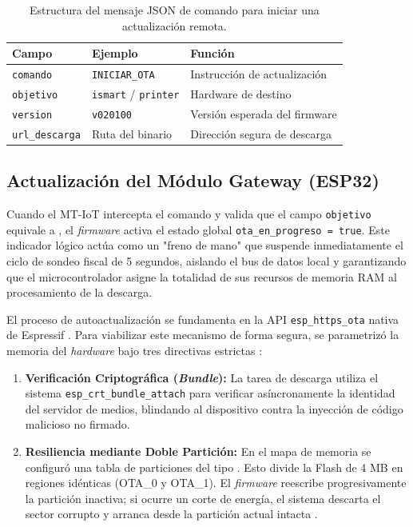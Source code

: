 \begin{table}[htbp]
\centering
\caption{Estructura del mensaje JSON de comando para iniciar una actualización remota.}
\label{tab:json_ota}
\begin{tabularx}{\textwidth}{@{}l l >{\raggedright\arraybackslash}X@{}}
\toprule
\textbf{Campo} & \textbf{Ejemplo} & \textbf{Función} \\
\midrule
\texttt{comando} & \texttt{INICIAR\_OTA} & Instrucción de actualización \\
\texttt{objetivo} & \texttt{ismart} / \texttt{printer} & Hardware de destino \\
\texttt{version} & \texttt{v020100} & Versión esperada del firmware \\
\texttt{url\_descarga} & Ruta del binario & Dirección segura de descarga \\
\bottomrule
\end{tabularx}
\end{table}

\subsection{Actualización del Módulo Gateway (ESP32)}

\par Cuando el MT-IoT intercepta el comando y valida que el campo \texttt{objetivo} equivale a , el \textit{firmware} activa el estado global \texttt{ota\_en\_progreso = true}. Este indicador lógico actúa como un "freno de mano" que suspende inmediatamente el ciclo de sondeo fiscal de 5 segundos, aislando el bus de datos local y garantizando que el microcontrolador asigne la totalidad de sus recursos de memoria RAM al procesamiento de la descarga.\\

\par El proceso de autoactualización se fundamenta en la API \texttt{esp\_https\_ota} nativa de Espressif \cite{Espressif_ESP_IDF_v552}. Para viabilizar este mecanismo de forma segura, se parametrizó la memoria del \textit{hardware} bajo tres directivas estrictas \cite{Espressif_Menuconfig}:

\begin{enumerate}
    \item \textbf{Verificación Criptográfica (\textit{Bundle}):} La tarea de descarga utiliza el sistema \texttt{esp\_crt\_bundle\_attach} para verificar asíncronamente la identidad del servidor de medios, blindando al dispositivo contra la inyección de código malicioso no firmado.
    
    \item \textbf{Resiliencia mediante Doble Partición:} En el mapa de memoria se configuró una tabla de particiones del tipo . Esto divide la Flash de 4 MB en regiones idénticas (OTA\_0 y OTA\_1). El \textit{firmware} reescribe progresivamente la partición inactiva; si ocurre un corte de energía, el sistema descarta el sector corrupto y arranca desde la partición actual intacta \cite{Espressif_ESP_IDF_v552}.
\end{enumerate}


